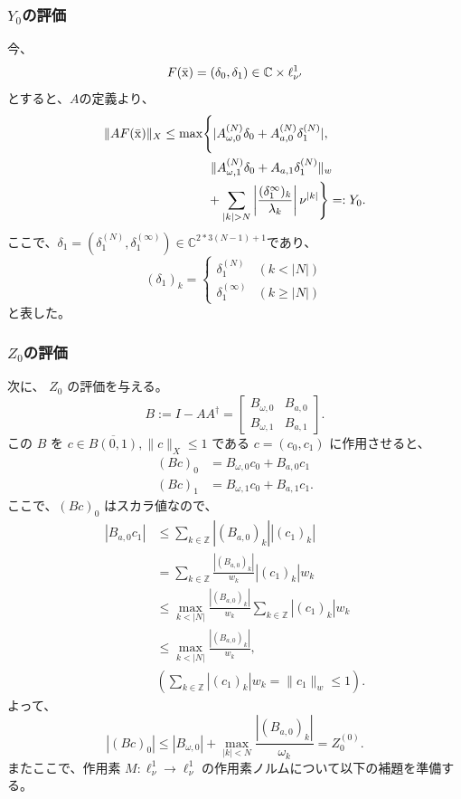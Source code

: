\subsubsection{$Y_0$の評価}
今、
$$
    F(\bar {\mathrm x}) = (\delta_0 , \delta_1) \in \mathbb{C} \times \ell^1_{\nu'}
$$
とすると、$A$の定義より、
\begin{align*}
    \|AF(\bar {\mathrm x})\|_X \leq \max&\Biggl\{|A^{(N)}_{\omega, 0} \delta_0 + A^{(N)}_{a,0} \delta^{(N)}_1|,  \\
    &~ \left. \|A^{(N)}_{\omega,1} \delta_0 + A_{a,1} \delta^{(N)}_1 \|_{w} \right. \\
    &~ + \sum_{|k| > N} \left| \frac{(\delta^{\infty}_1)_k}{\lambda_k} \right| \nu^{|k|}\Biggr\}=:Y_0.
\end{align*}
ここで、$\delta_1=(\delta_1^{(N)}, \delta^{(\infty)}_1)\in\mathbb{C}^{2*3(N-1)+1}$であり、
$$
    (\delta_1)_k = 
    \begin{cases}
    \delta_1^{(N)} &(k < |N|) \\
    \delta_1^{(\infty)} &(k \geq |N|)
    \end{cases}
$$
と表した。

\subsubsection{$Z_0$の評価}
次に、 $Z_0$ の評価を与える。
$$
    B := I - AA^\dagger = \begin{bmatrix}
          B_{\omega , 0} & B_{a,0} \\
          B_{\omega, 1} & B_{a,1}
         \end{bmatrix}.
$$
この $B$ を $c \in \overline{B(0,1)}, \| c \|_X \le 1$ である $c = (c_0, c_1)$ に作用させると、
    \begin{align*}
    (Bc)_0 &= B_{\omega,0} c_0 + B_{a,0}c_1 \\
    (Bc)_1 &= B_{\omega,1} c_0 + B_{a,1}c_1.
    \end{align*}
ここで、$(Bc)_0$ はスカラ値なので、
\begin{align*}
|B_{a,0} c_1| &\leq \sum_{k \in \mathbb{Z}}|(B_{a,0})_k||(c_1)_k| \\
&= \sum_{k \in \mathbb{Z}} \frac{|(B_{a,0})_k|}{w_k} |(c_1)_k|w_k \\
&\leq \underset{k < |N|}{\max} \frac{|(B_{a,0})_k|}{w_k} \sum_{k \in \mathbb{Z}} |(c_1)_k|w_k \\
&\leq \underset{k < |N|}{\max} \frac{|(B_{a,0})_k|}{w_k}, \\
&(\sum_{k \in \mathbb{Z} }|(c_1)_k|w_k = \|c_1 \|_w \le 1).
\end{align*}
よって、
$$
|(Bc)_0| \leq |B_{\omega,0}| + \underset{|k| < N}{\max} \frac{|(B_{a,0})_k|}{\omega_k} = Z_0^{(0)}.
$$
またここで、作用素 $M:\ell_{\nu}^1\to \ell_{\nu}^1$ の作用素ノルムについて以下の補題を準備する。

